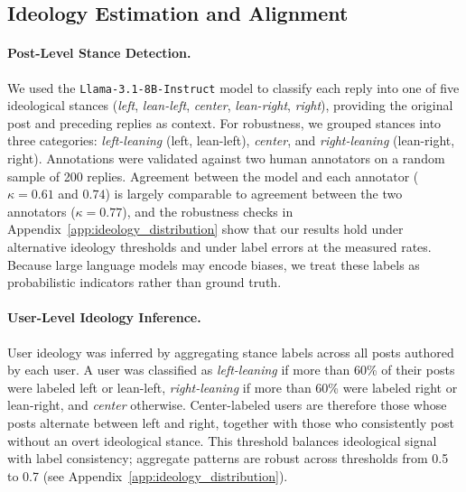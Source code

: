 \documentclass[letterpaper]{article} %
\newcommand{\cb}[1]{\textcolor{blue}{CB: #1}}
\newcommand{\rev}[1]{{\color{blue}#1}}
\begin{document}
\subsection{Ideology Estimation and Alignment}

\paragraph*{Post-Level Stance Detection.}
We used the \texttt{Llama-3.1-8B-Instruct} model to classify each reply into one of five ideological stances (\textit{left}, \textit{lean-left}, \textit{center}, \textit{lean-right}, \textit{right}), providing the original post and preceding replies as context. For robustness, we grouped stances into three categories: \textit{left-leaning} (left, lean-left), \textit{center}, and \textit{right-leaning} (lean-right, right). Annotations were validated against two human annotators on a random sample of 200 replies\rev{. Agreement between the model and each annotator ($\kappa = 0.61$ and $0.74$) is largely comparable to agreement between the two annotators ($\kappa = 0.77$), and the robustness checks in Appendix~\ref{app:ideology_distribution} show that our results hold under alternative ideology thresholds and under label errors at the measured rates}. Because large language models may encode biases, we treat these labels as probabilistic indicators rather than ground truth.

\paragraph*{User-Level Ideology Inference.}
User ideology was inferred by aggregating stance labels across all posts authored by each user. A user was classified as \textit{left-leaning} if more than 60\% of their posts were labeled left or lean-left, \textit{right-leaning} if more than 60\% were labeled right or lean-right, and \textit{center} otherwise. \rev{Center-labeled users are therefore those whose posts alternate between left and right, together with those who consistently post without an overt ideological stance.} This threshold balances ideological signal with label consistency; aggregate patterns are robust across thresholds from 0.5 to 0.7 (see Appendix~\ref{app:ideology_distribution}). 

\end{document}
